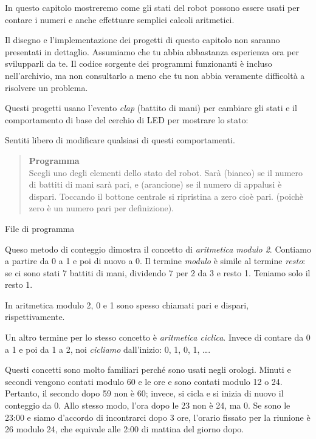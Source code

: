 
\label{ch.counting}

In questo capitolo mostreremo come gli stati del robot possono essere usati per contare i numeri e anche effettuare semplici calcoli aritmetici.

Il disegno e l'implementazione dei progetti di questo capitolo non saranno presentati in dettaglio.
Assumiamo che tu abbia abbastanza esperienza ora per svilupparli da te.
Il codice sorgente dei programmi funzionanti è incluso nell'archivio, ma non consultarlo a meno che tu non abbia veramente
difficoltà a risolvere un problema.

Questi progetti usano l'evento \emph{clap} (battito di mani) per cambiare gli stati e il comportamento di base del cerchio di LED 
per mostrare lo stato:


Sentiti libero di modificare qualsiasi di questi comportamenti.


\begin{quote}
\textbf{Programma}\\Scegli uno degli elementi dello stato del robot.
Sarà  (bianco) se il numero di battiti di mani sarà pari, e 
  (arancione) se il numero di appalusi è dispari.
Toccando il bottone centrale si ripristina a zero cioè pari. 
(poichè zero è un numero pari per definizione).
\end{quote}

{\raggedleft \hfill File di programma }

Queso metodo di conteggio dimostra il concetto di
\emph{aritmetica modulo 2}.
Contiamo a partire da 0 a 1 e poi di nuovo a 0.
Il termine \emph{modulo} è simile al termine \emph{resto}:
se ci sono stati 7 battiti di mani, dividendo 7 per 2 da 3 e resto 1.
Teniamo solo il resto 1.

In aritmetica modulo 2, 0 e 1 sono spesso chiamati pari e dispari,
rispettivamente.

Un altro termine per lo stesso concetto è \emph{aritmetica ciclica}.
Invece di contare da 0 a 1 e poi da 1 a 2,
noi \emph{cicliamo} dall'inizio:
0, 1, 0, 1, \ldots.

Questi concetti sono molto familiari perché sono usati negli orologi.
Minuti e secondi vengono contati modulo 60 e le ore e sono contati modulo
12 o 24. Pertanto, il secondo dopo 59 non è 60; invece, si cicla e si
inizia di nuovo il conteggio da 0. Allo stesso modo, l'ora dopo le 23 non è 24,
ma 0.  Se sono le 23:00 e siamo d'accordo di incontrarci dopo 3 ore,
l'orario fissato per la riunione è 26 modulo 24, che equivale alle 2:00 di
mattina del giorno dopo.

